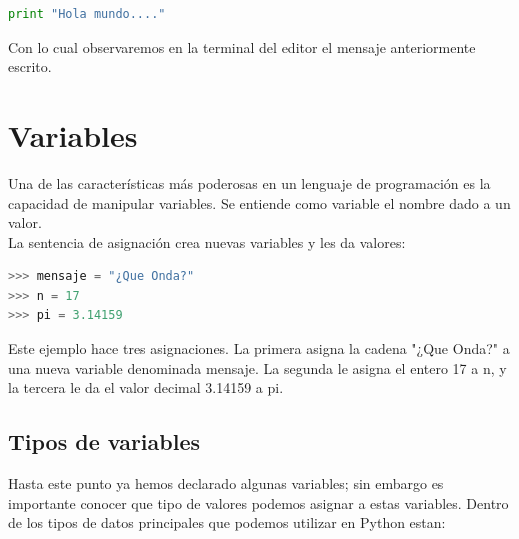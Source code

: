 \documentclass[a4paper, openright, 12pt]{article}
\begin{document}
    \begin{lstlisting}[language=Python]
      print "Hola mundo...."
    \end{lstlisting}

    Con lo cual observaremos en la terminal del editor el mensaje anteriormente escrito.




  \newpage{}




  \section{Variables}
    Una de las características más poderosas en un lenguaje de programación es la capacidad de manipular variables. Se entiende como variable el nombre dado a un valor.\\

    La sentencia de asignación crea nuevas variables y les da valores:

    \begin{lstlisting}[language=Python]
>>> mensaje = "¿Que Onda?"
>>> n = 17
>>> pi = 3.14159
    \end{lstlisting}

    Este ejemplo hace tres asignaciones. La primera asigna la cadena "¿Que Onda?" a una nueva variable denominada mensaje. La segunda le asigna el entero 17 a n, y la tercera le da el valor decimal 3.14159 a pi.\\

    \subsection{Tipos de variables}
        Hasta este punto ya hemos declarado algunas variables; sin embargo es importante conocer que tipo de valores podemos asignar a estas variables. Dentro de los tipos de datos principales que podemos utilizar en Python estan:\\
\end{document}
